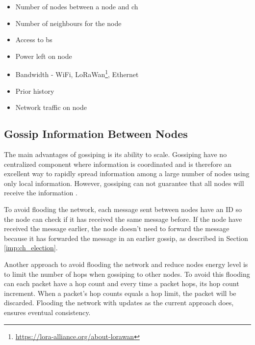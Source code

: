 \documentclass[USenglish]{uit-thesis}
\begin{document}
\begin{itemize}
\item Number of nodes between a node and \gls{ch}
\item Number of neighbours for the node
\item Access to \gls{bs}
\item Power left on node
\item Bandwidth - WiFi, LoRaWan\footnote{\url{https://lora-alliance.org/about-lorawan}}, Ethernet
\item Prior history
\item Network traffic on node
\end{itemize}







\subsection{Gossip Information Between Nodes}
The main advantages of gossiping is its ability to scale. Gossiping have no centralized component where information is coordinated and is therefore an excellent way to rapidly spread information among a large number of nodes using only local information. However, gossiping can not guarantee that all nodes will receive the information \cite{demers}.

To avoid flooding the network, each message sent between nodes have an ID so the node can check if it has received the same message before. If the node have received the message earlier, the node doesn't need to forward the message because it has forwarded the message in an earlier gossip, as described in Section \ref{imp:ch_election}.

\newpage

Another approach to avoid flooding the network and reduce nodes energy level is to limit the number of hops when gossiping to other nodes. To avoid this flooding can each packet have a hop count and every time a packet hops, its hop count increment. When a packet's hop counts equals a hop limit, the packet will be discarded. Flooding the network with updates as the current approach does, ensures eventual consistency.
 
\end{document}

